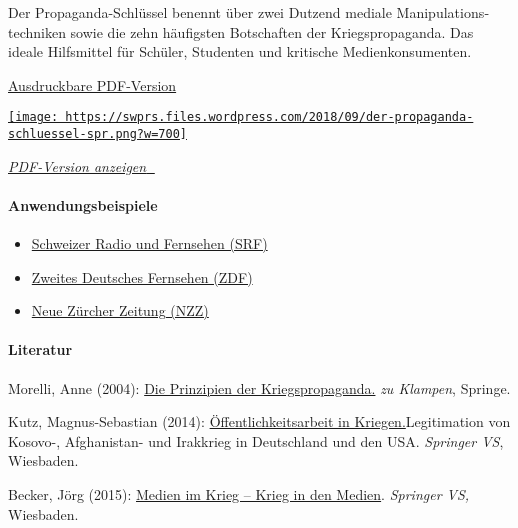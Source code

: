 Der Propaganda-Schlüssel benennt über zwei Dutzend mediale
Manipulations­techniken sowie die zehn häufigsten Botschaften der
Kriegs­propaganda. Das ideale Hilfsmittel für Schüler, Studenten und
kritische Medienkonsumenten.

\href{https://swprs.files.wordpress.com/2018/09/propaganda-schluessel-spr.pdf}{Ausdruckbare
PDF-Version}

\href{https://swprs.files.wordpress.com/2018/09/propaganda-schluessel-spr.pdf}{\texttt{[image: https://swprs.files.wordpress.com/2018/09/der-propaganda-schluessel-spr.png?w=700]}}

\href{https://swprs.files.wordpress.com/2018/09/propaganda-schluessel-spr.pdf}{\emph{PDF-Version
anzeigen} 🔎}

\hypertarget{anwendungsbeispiele}{%
\paragraph{Anwendungsbeispiele}\label{anwendungsbeispiele}}

\begin{itemize}
\tightlist
\item
  \href{https://swprs.org/srf-propaganda-analyse/}{Schweizer Radio und
  Fernsehen (SRF)}
\item
  \href{https://swprs.org/srf-propaganda-analyse/\#ZDF}{Zweites
  Deutsches Fernsehen (ZDF)}
\item
  \href{https://swprs.org/die-nzz-studie/}{Neue Zürcher Zeitung (NZZ)}
\end{itemize}

\hypertarget{literatur}{%
\paragraph{Literatur}\label{literatur}}

Morelli, Anne (2004):
\href{http://zuklampen.de/buecher/sachbuch/politik/bk/458-die-prinzipien-der-kriegspropaganda-9783866744158.html}{Die
Prinzipien der Kriegspropaganda.} \emph{zu Klampen}, Springe.

Kutz, Magnus-Sebastian (2014):
\href{https://www.springer.com/de/book/9783658048631}{Öffentlichkeitsarbeit
in Kriegen.}Legitimation von Kosovo-, Afghanistan- und Irakkrieg in
Deutschland und den USA. \emph{Springer VS}, Wiesbaden.

Becker, Jörg (2015):
\href{https://www.springer.com/de/book/9783658074760}{Medien im Krieg --
Krieg in den Medien}. \emph{Springer VS,} Wiesbaden.

